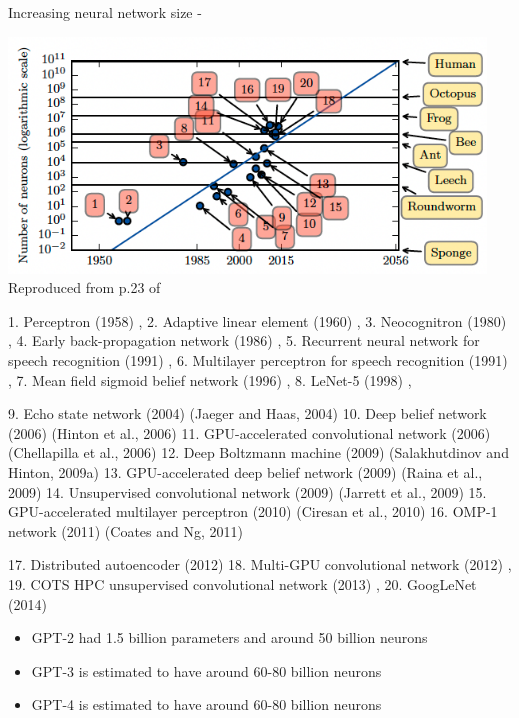 \begin{frame}[t,allowframebreaks]{Increasing neural network size - }
    \begin{center}
        \includegraphics[width=0.95\textwidth]
           {./images/dl_intro/nnet_size_neurons_vs_time_01.png}\\
        {\scriptsize \color{col:attribution} 
        Reproduced from p.23 of \cite{Goodfellow:2017DL}}\\
    \end{center}
       {\tiny
       1. Perceptron (1958) \cite{Rosenblatt:1958p},
       2. Adaptive linear element (1960) \cite{Widrow:1960as},
       3. Neocognitron (1980) \cite{Fukushima:1980nc},
       4. Early back-propagation network (1986) \cite{Rumelhart:1986erp},
       5. Recurrent neural network for speech recognition (1991) \cite{Robinson:1991rerp},
       6. Multilayer perceptron for speech recognition (1991) \cite{Bengio:1991pma},
       7. Mean field sigmoid belief network (1996) \cite{Saul:1996mf},
       8. LeNet-5 (1998) \cite{LeCun:1998ln5},

       9. Echo state network (2004) (Jaeger and Haas, 2004)
       10. Deep belief network (2006) (Hinton et al., 2006)
       11. GPU-accelerated convolutional network (2006) (Chellapilla et al., 2006)
       12. Deep Boltzmann machine (2009) (Salakhutdinov and Hinton, 2009a)
       13. GPU-accelerated deep belief network (2009) (Raina et al., 2009)
       14. Unsupervised convolutional network (2009) (Jarrett et al., 2009)
       15. GPU-accelerated multilayer perceptron (2010) (Ciresan et al., 2010)
       16. OMP-1 network (2011) (Coates and Ng, 2011)
       
       17. Distributed autoencoder (2012) \cite{Le:2012daut}
       18. Multi-GPU convolutional network (2012) \cite{Krizhevsky:2012img},
       19. COTS HPC unsupervised convolutional network (2013) \cite{Coates:2013cots},       
       20. GoogLeNet (2014) \cite{Szegedy:2014gnet}\\
       }

    \framebreak


    \begin{itemize}
        \item GPT-2 had 1.5 billion parameters and around 50 billion neurons
        \item GPT-3 is estimated to have around 60-80 billion neurons
        \item GPT-4 is estimated to have around 60-80 billion neurons
    \end{itemize}

\end{frame}
